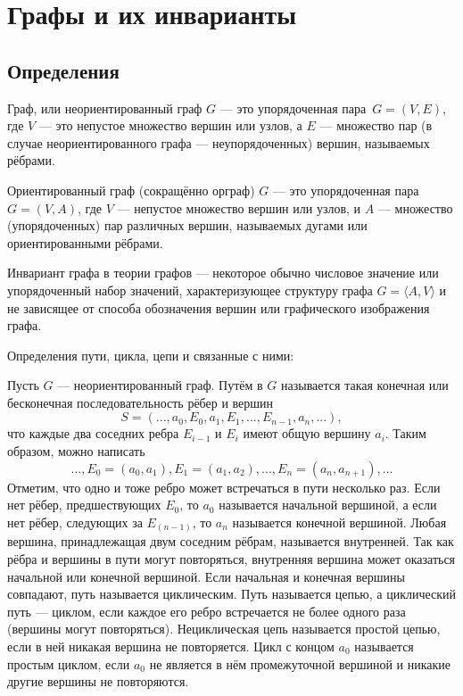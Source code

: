 \chapter{Графы и их инварианты}

\section{Определения}

\begin{my_def}
Граф, или неориентированный граф $G$ --- это упорядоченная пара~$G=(V,E)$,
где $V$ --- это непустое множество вершин или узлов, а $E$ --- множество пар
(в случае неориентированного графа — неупорядоченных) вершин, называемых рёбрами.
\end{my_def}

\begin{my_def}
Ориентированный граф (сокращённо орграф)  $G$ --- это упорядоченная пара~$G=(V,A)$,
где  $V$ — непустое множество вершин или узлов, и  $A$ — множество (упорядоченных)
пар различных вершин, называемых дугами или ориентированными рёбрами.
\end{my_def}

\begin{my_def}
Инвариант графа в теории графов --- некоторое обычно числовое значение или упорядоченный
набор значений, характеризующее структуру графа  $G=\langle A,V\rangle$
и не зависящее от способа обозначения вершин или графического изображения графа.
\end{my_def}

Определения пути, цикла, цепи и связанные с ними:

\begin{my_def}
Пусть $G$ --- неориентированный граф. Путём в $G$ называется такая конечная или
бесконечная последовательность рёбер и вершин
$$S = (..., a_0,E_0, a_1, E_1, ..., E_{n-1}, a_n, ...),$$
что каждые два соседних ребра  $E_{i-1}$ и  $E_{i}$ имеют общую вершину  $a_{i}$.
Таким образом, можно написать
$$..., E_0=(a_0,a_1), E_1=(a_1,a_2), ... , E_n=(a_n,a_{n+1}), ...$$
Отметим, что одно и тоже ребро может встречаться в пути несколько раз. Если нет рёбер,
предшествующих  $E_{0}$, то  $a_{0}$ называется начальной вершиной, а если нет
рёбер, следующих за  $E_{(n-1)}$, то  $a_n$ называется конечной вершиной.
Любая вершина, принадлежащая двум соседним рёбрам, называется внутренней.
Так как рёбра и вершины в пути могут повторяться, внутренняя вершина может оказаться
начальной или конечной вершиной. Если начальная и конечная вершины совпадают,
путь называется циклическим. Путь называется цепью, а циклический путь — циклом,
если каждое его ребро встречается не более одного раза (вершины могут повторяться).
Нециклическая цепь называется простой цепью, если в ней никакая вершина не повторяется.
Цикл с концом  $a_{0}$ называется простым циклом, если  $a_{0}$ не является в нём
промежуточной вершиной и никакие другие вершины не повторяются.
\end{my_def}

